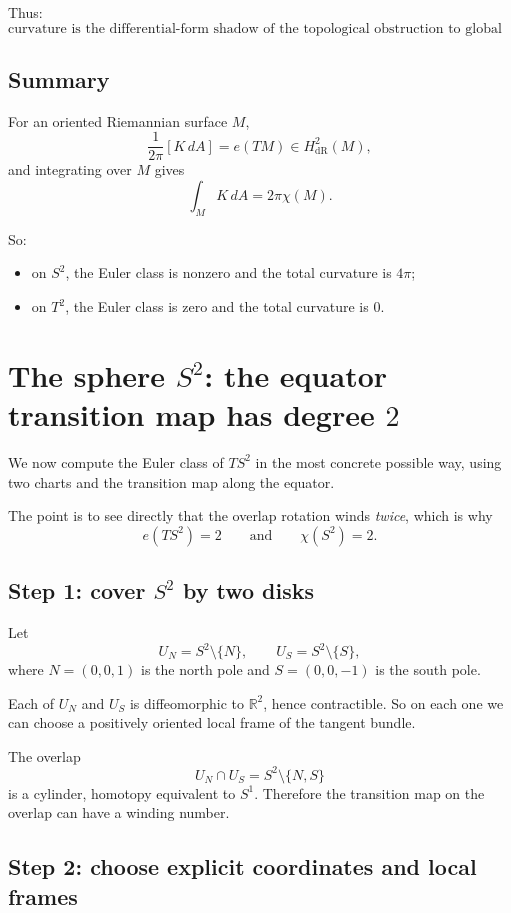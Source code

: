 \documentclass[11pt]{article}
\begin{document}
	Thus:
	\[
	\boxed{
		\text{curvature is the differential-form shadow of the topological obstruction to global framing.}
	}
	\]
	
	\subsection*{Summary}
	
	For an oriented Riemannian surface \(M\),
	\[
	\frac{1}{2\pi}[K\,dA]=e(TM)\in H^2_{\mathrm{dR}}(M),
	\]
	and integrating over \(M\) gives
	\[
	\int_M K\,dA = 2\pi\chi(M).
	\]
	
	So:
	\begin{itemize}
		\item on \(S^2\), the Euler class is nonzero and the total curvature is \(4\pi\);
		\item on \(T^2\), the Euler class is zero and the total curvature is \(0\).
	\end{itemize}
	
	\newpage
	\section{The sphere \(S^2\): the equator transition map has degree \(2\)}
	
	We now compute the Euler class of \(TS^2\) in the most concrete possible way, using two charts and the transition map along the equator.
	
	The point is to see directly that the overlap rotation winds \emph{twice}, which is why
	\[
	e(TS^2)=2
	\qquad\text{and}\qquad
	\chi(S^2)=2.
	\]
	
	\subsection*{Step 1: cover \(S^2\) by two disks}
	
	Let
	\[
	U_N=S^2\setminus\{N\},
	\qquad
	U_S=S^2\setminus\{S\},
	\]
	where \(N=(0,0,1)\) is the north pole and \(S=(0,0,-1)\) is the south pole.
	
	Each of \(U_N\) and \(U_S\) is diffeomorphic to \(\mathbb{R}^2\), hence contractible. So on each one we can choose a positively oriented local frame of the tangent bundle.
	
	The overlap
	\[
	U_N\cap U_S = S^2\setminus\{N,S\}
	\]
	is a cylinder, homotopy equivalent to \(S^1\). Therefore the transition map on the overlap can have a winding number.
	
	\subsection*{Step 2: choose explicit coordinates and local frames}
	
\end{document}
